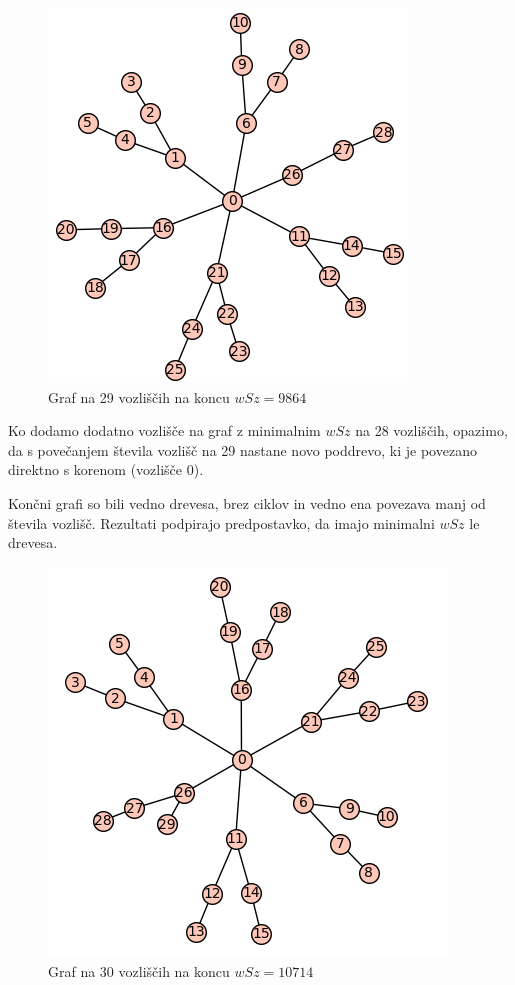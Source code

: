 \documentclass[12pt, a4paper]{article}
\begin{document}
\begin{figure}[h]
\centering
\includegraphics[scale=0.4]{koncni_graf29}
\caption{Graf na 29 vozliščih na koncu $wSz = 9864$}
\end{figure}

Ko dodamo dodatno vozlišče na graf z minimalnim $wSz$ na 28 vozliščih, opazimo, da s povečanjem števila vozlišč na 29 nastane novo poddrevo, ki je povezano direktno s korenom (vozlišče 0).

Končni grafi so bili vedno drevesa, brez ciklov in vedno ena povezava manj od števila vozlišč. Rezultati podpirajo predpostavko, da imajo  minimalni $wSz$ le drevesa.

\newpage

\begin{figure}[h]
\centering
\includegraphics[scale=0.4]{koncni_graf30}
\caption{Graf na 30 vozliščih na koncu $wSz = 10714$}
\end{figure}
\end{document}
